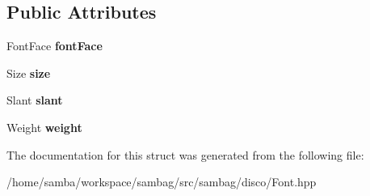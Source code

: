 \subsection*{Public Attributes}
\begin{DoxyCompactItemize}
\item 
\hypertarget{structsambag_1_1disco_1_1_font_a21aa90735405d5f6489cbfc8b68e034e}{
FontFace {\bfseries fontFace}}
\label{structsambag_1_1disco_1_1_font_a21aa90735405d5f6489cbfc8b68e034e}

\item 
\hypertarget{structsambag_1_1disco_1_1_font_adad2ee9d3e0e963ecae553137b3809c7}{
Size {\bfseries size}}
\label{structsambag_1_1disco_1_1_font_adad2ee9d3e0e963ecae553137b3809c7}

\item 
\hypertarget{structsambag_1_1disco_1_1_font_ab67cc52b9b8edff0b3edab4c1af493a9}{
Slant {\bfseries slant}}
\label{structsambag_1_1disco_1_1_font_ab67cc52b9b8edff0b3edab4c1af493a9}

\item 
\hypertarget{structsambag_1_1disco_1_1_font_aa1ef1ba648c6a98fe709ab2dd8f69dc0}{
Weight {\bfseries weight}}
\label{structsambag_1_1disco_1_1_font_aa1ef1ba648c6a98fe709ab2dd8f69dc0}

\end{DoxyCompactItemize}


The documentation for this struct was generated from the following file:\begin{DoxyCompactItemize}
\item 
/home/samba/workspace/sambag/src/sambag/disco/Font.hpp\end{DoxyCompactItemize}
